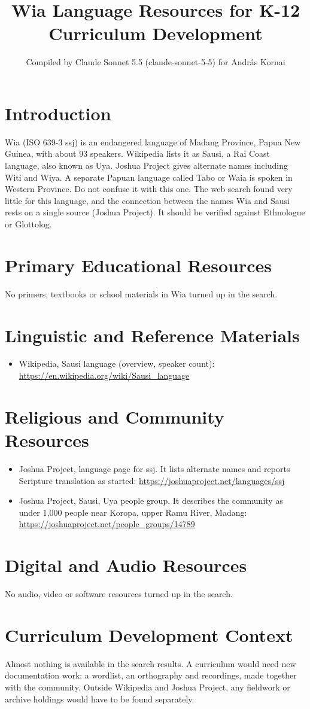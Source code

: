 \documentclass[12pt]{article}
\title{Wia Language Resources for K-12 Curriculum Development}
\author{Compiled by Claude Sonnet 5.5 (claude-sonnet-5-5) for Andr\'as Kornai}
\date{}
\begin{document}
\maketitle

\section{Introduction}
Wia (ISO 639-3 ssj) is an endangered language of Madang Province, Papua New Guinea, with about 93 speakers. Wikipedia lists it as Sausi, a Rai Coast language, also known as Uya. Joshua Project gives alternate names including Witi and Wiya. A separate Papuan language called Tabo or Waia is spoken in Western Province. Do not confuse it with this one. The web search found very little for this language, and the connection between the names Wia and Sausi rests on a single source (Joshua Project). It should be verified against Ethnologue or Glottolog.

\section{Primary Educational Resources}
No primers, textbooks or school materials in Wia turned up in the search.

\section{Linguistic and Reference Materials}
\begin{itemize}
\item Wikipedia, Sausi language (overview, speaker count): \url{https://en.wikipedia.org/wiki/Sausi_language}
\end{itemize}

\section{Religious and Community Resources}
\begin{itemize}
\item Joshua Project, language page for ssj. It lists alternate names and reports Scripture translation as started: \url{https://joshuaproject.net/languages/ssj}
\item Joshua Project, Sausi, Uya people group. It describes the community as under 1,000 people near Koropa, upper Ramu River, Madang: \url{https://joshuaproject.net/people_groups/14789}
\end{itemize}

\section{Digital and Audio Resources}
No audio, video or software resources turned up in the search.

\section{Curriculum Development Context}
Almost nothing is available in the search results. A curriculum would need new documentation work: a wordlist, an orthography and recordings, made together with the community. Outside Wikipedia and Joshua Project, any fieldwork or archive holdings would have to be found separately.
\end{document}
